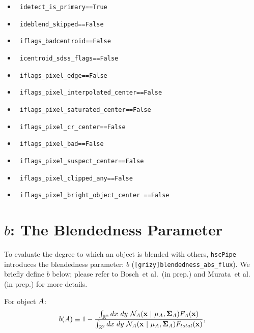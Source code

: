 \documentclass[useamsfonts]{pasj01}
\def\etal{{\ et al.~}}
\def\hscpipe{\texttt{hscPipe}}
\begin{document}
    \begin{itemize}

        \item[ ] \texttt{ idetect\_is\_primary==True }
        \item[ ] \texttt{ ideblend\_skipped==False }
        \item[ ] \texttt{ iflags\_badcentroid==False }
        \item[ ] \texttt{ icentroid\_sdss\_flags==False }
        \item[ ] \texttt{ iflags\_pixel\_edge==False }
        \item[ ] \texttt{ iflags\_pixel\_interpolated\_center==False }
        \item[ ] \texttt{ iflags\_pixel\_saturated\_center==False }
        \item[ ] \texttt{ iflags\_pixel\_cr\_center==False }
        \item[ ] \texttt{ iflags\_pixel\_bad==False }
        \item[ ] \texttt{ iflags\_pixel\_suspect\_center==False }
        \item[ ] \texttt{ iflags\_pixel\_clipped\_any==False }
        \item[ ] \texttt{ iflags\_pixel\_bright\_object\_center ==False }

    \end{itemize}


\section{$b$: The Blendedness Parameter}
    \label{app:defineb}

    To evaluate the degree to which an object is blended with others, \hscpipe{} 
    introduces the blendedness parameter: $b$ (\texttt{[grizy]blendedness\_abs\_flux}).
    We briefly define  $b$ below; please refer to Bosch\etal (in prep.) and Murata\etal 
    (in prep.) for more details.

    For object ${\rm A}$:
    \begin{eqnarray*}
        b({\rm A}) \equiv
        1-\frac{\int_{\mathbb{R}^2} {\rm d}x~ {\rm d}y\ \mathcal{N}_{\mathrm{A}}({\bf x}\ |\  \mu_{\mathrm{A}}, {\bf\Sigma}_{\mathrm{A}})
        F_{\mathrm{A}}({\bf x})}{\int_{\mathbb{R}^2} {\rm d}x~ {\rm d}y\ \mathcal{N}_{\mathrm{A}}({\bf x}\ |\  \mu_{\mathrm{A}},
        {\bf\Sigma}_{\rm{A}}) F_{\rm{total}}({\bf x})},
        \label{eq:defineb}
    \end{eqnarray*}
\end{document}
